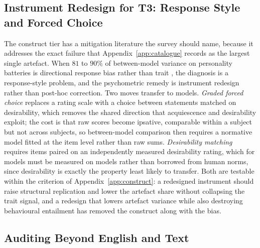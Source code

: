 \documentclass[11pt]{article}
\begin{document}
\subsection{Instrument Redesign for T3: Response Style and Forced Choice}
\label{app:sdr}

The construct tier has a mitigation literature the survey should name, because
it addresses the exact failure that Appendix~\ref{app:catalogue} records as the
largest single artefact. When $81$ to $90\%$ of between-model variance on
personality batteries is directional response bias rather than trait
\cite{meyer2026apparent}, the diagnosis is a response-style problem, and the
psychometric remedy is instrument redesign rather than post-hoc correction.
Two moves transfer to models. \emph{Graded forced choice} replaces a rating
scale with a choice between statements matched on desirability, which removes
the shared direction that acquiescence and desirability exploit; the cost is that
raw scores become ipsative, comparable within a subject but not across subjects,
so between-model comparison then requires a normative model fitted at the item
level rather than raw sums. \emph{Desirability matching} requires items paired on
an independently measured desirability rating, which for models must be measured
on models rather than borrowed from human norms, since desirability is exactly
the property least likely to transfer. Both are testable within the criterion of
Appendix~\ref{app:construct}: a redesigned instrument should raise structural
replication and lower the artefact share without collapsing the trait signal,
and a redesign that lowers artefact variance while also destroying behavioural
entailment has removed the construct along with the bias.

\subsection{Auditing Beyond English and Text}
\label{app:mmrecipe}
\end{document}
